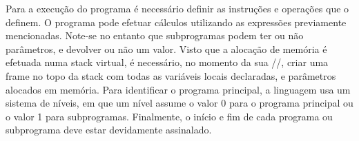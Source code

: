 Para a execução do programa é necessário definir as instruções e operações que
o definem. O programa pode efetuar cálculos utilizando as expressões previamente
mencionadas. Note-se no entanto que subprogramas podem ter ou não parâmetros,
e devolver ou não um valor. Visto que a alocação de memória é efetuada numa
stack virtual, é necessário, no momento da sua //, criar uma frame no topo da
stack com todas as variáveis locais declaradas, e parâmetros alocados em
memória. Para identificar o programa principal, a linguagem usa um sistema de
níveis, em que um nível assume o valor 0 para o programa principal ou o valor
1 para subprogramas. Finalmente, o início e fim de cada programa ou subprograma
deve estar devidamente assinalado.  

   




 



